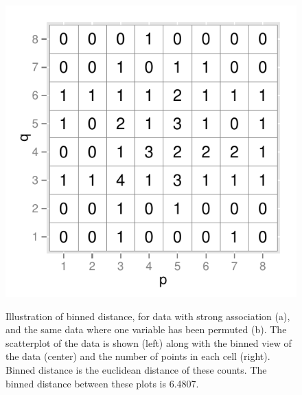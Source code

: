 \documentclass[12]{article}
\newcommand{\red}[1]{{\color{red} #1}}
\begin{document}
\begin{itemize}
\begin{figure}[hbtp]
{\includegraphics[scale=0.55]{freq-example-2.pdf}

\label{type_2}
}
\label{plottype}
	\vspace{-.1in}
       \caption{Illustration of binned distance, for data with strong association (a), and the same data where one variable has been permuted (b). The scatterplot of the data is shown (left) along with the binned view of the data (center) and the number of points in each cell (right). Binned distance is the euclidean distance of these counts. The binned distance between these plots is 6.4807. }
\end{figure}




\end{itemize}
\end{document}
